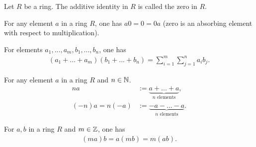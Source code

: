 \begin{definition}{}{}
    Let $R$ be a ring. The additive identity in $R$ is called the zero in $R$. 
\end{definition}

\begin{proposition}{}{}
    For any element $a$ in a ring $R$, one has $a0 = 0 = 0a$ (zero is an absorbing element with respect to multiplication). 
\end{proposition}

\begin{proposition}{}{}
    For elements $a_1,...,a_m,b_1,...,b_n$, one has
    \begin{align*}
        (a_1+...+a_m)(b_1+...+b_n)=\sum\limits_{i=1}^{m}\sum\limits_{j=1}^{n}a_ib_j.
    \end{align*}
\end{proposition}

\begin{definition}{}{}
    For any element $a$ in a ring $R$ and $n\in\mathbb{N}$.
    \begin{align*}
        na &:= \underbrace{a+...+a}_{n \text{ elements}},\\
        (-n)a=n(-a) &:= \underbrace{-a-...-a}_{n \text{ elements}}. 
    \end{align*}
\end{definition}

\begin{proposition}{}{}
    For $a,b$ in a ring $R$ and $m\in\mathbb{Z}$, one has 
    \begin{align*}
        (ma)b=a(mb)=m(ab).
    \end{align*}
\end{proposition}


